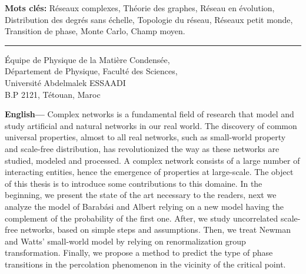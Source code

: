 \documentclass[a4paper,12pt]{book}
\makeatletter
\def\cleardoublepage{\clearpage\if@twoside \ifodd\c@page\else%
  \hbox{}%
  \thispagestyle{empty}%
  \newpage%
  \if@twocolumn\hbox{}\newpage\fi\fi\fi}
\theoremstyle{break}
\makeatother
\begin{document}
{\large\textbf{Mots clés:}}
{Réseaux complexes, Théorie des graphes, Réseau en évolution, Distribution des degrés sans échelle, Topologie du réseau, Réseaux petit monde, Transition de phase, Monte Carlo, Champ moyen. }\\
\noindent\rule[2pt]{\textwidth}{0.5pt}

\begin{center}
  Équipe de Physique de la Matière Condensée,\\ 
  Département de Physique, Faculté des Sciences,\\
Université Abdelmalek ESSAADI\\
B.P 2121, Tétouan, Maroc\\
\end{center}


\newpage

{\large\textbf{English---}}
Complex networks is a fundamental field of research that model and study artificial and natural networks in our real world. The discovery of common universal properties, almost to all real networks, such as small-world property and scale-free distribution, has revolutionized the way as these networks are studied, modeled and processed.
A complex network consists of a large number of interacting entities, hence the emergence of properties at large-scale. The object of this thesis is to introduce some contributions to this domaine. In the beginning, we present the state of the art necessary to the readers, next we analyze the model of Barabási and Albert relying on a new model having the complement of the probability of the first one. After, we study uncorrelated scale-free networks, based on simple steps and assumptions. Then, we treat Newman and Watts' small-world model by relying on renormalization group transformation. 
Finally, we propose a method to predict the type of phase transitions in the percolation phenomenon in the vicinity of the critical point.
\end{document}
